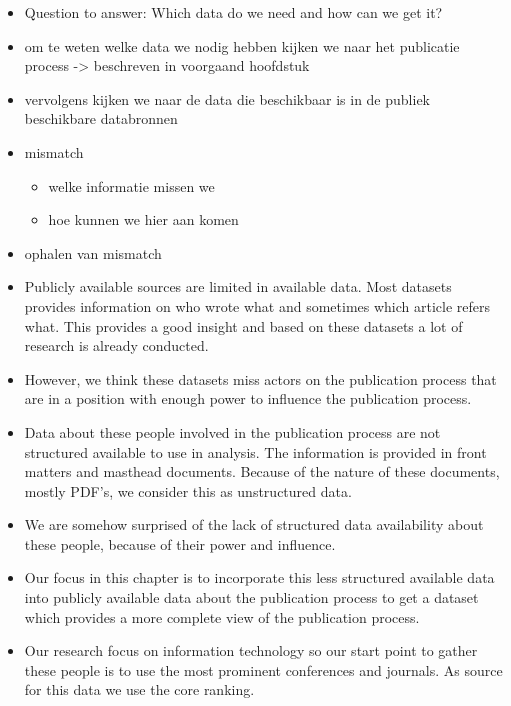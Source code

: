 \documentclass{ou-report}
\newcommand{\outline}[1]{{\color{blue} #1}}
\begin{document}
\outline{
\begin{itemize}
    \item Question to answer: Which data do we need and how can we get it?
    \item om te weten welke data we nodig hebben kijken we naar het publicatie process -> beschreven in voorgaand hoofdstuk
    \item vervolgens kijken we naar de data die beschikbaar is in de publiek beschikbare databronnen
    \item mismatch
    \begin{itemize}
        \item welke informatie missen we
        \item hoe kunnen we hier aan komen
    \end{itemize}
    \item ophalen van mismatch
\end{itemize}
\begin{itemize}
    \item Publicly available sources are limited in available data. Most datasets provides information on who wrote what and sometimes which article refers what. This provides a good insight and based on these datasets a lot of research is already conducted.
    \item However, we think these datasets miss actors on the publication process that are in a position with enough power to influence the publication process.
    \item Data about these people involved in the publication process are not structured available to use in analysis. The information is provided in front matters and masthead documents. Because of the nature of these documents, mostly PDF's, we consider this as unstructured data.
    \item We are somehow surprised of the lack of structured data availability about these people, because of their power and influence.
    \item Our focus in this chapter is to incorporate this less structured available data into publicly available data about the publication process to get a dataset which provides a more complete view of the publication process.
    \item Our research focus on information technology so our start point to gather these people is to use the most prominent conferences and journals. As source for this data we use the core ranking.
\end{itemize}
}
\end{document}
